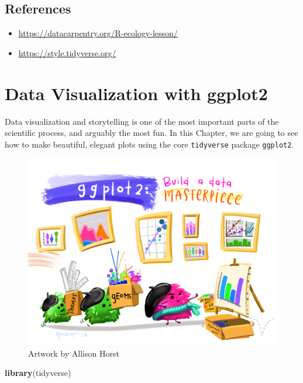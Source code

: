 \documentclass[
]{book}
\newenvironment{Shaded}{\begin{snugshade}}{\end{snugshade}}
\newcommand{\FunctionTok}[1]{\textcolor[rgb]{0.13,0.29,0.53}{\textbf{#1}}}
\newcommand{\NormalTok}[1]{#1}
\providecommand{\tightlist}{%
  \setlength{\itemsep}{0pt}\setlength{\parskip}{0pt}}
\begin{document}
\hypertarget{references-7}{%
\section{References}\label{references-7}}

\begin{itemize}
\tightlist
\item
  \url{https://datacarpentry.org/R-ecology-lesson/}
\item
  \url{https://style.tidyverse.org/}
\end{itemize}

\hypertarget{ggplot2}{%
\chapter{Data Visualization with ggplot2}\label{ggplot2}}

Data visualization and storytelling is one of the most important parts of the
scientific process, and arguably the most fun. In this Chapter, we are going to
see how to make beautiful, elegant plots using the core \texttt{tidyverse} package
\texttt{ggplot2}.

\begin{figure}

{\centering \includegraphics[width=0.8\linewidth]{img/ggplot2_masterpiece} 

}

\caption{Artwork by Allison Horst}\label{fig:gg0}
\end{figure}

\begin{Shaded}
\begin{Highlighting}[]
\FunctionTok{library}\NormalTok{(tidyverse)}
\end{Highlighting}
\end{Shaded}
\end{document}
